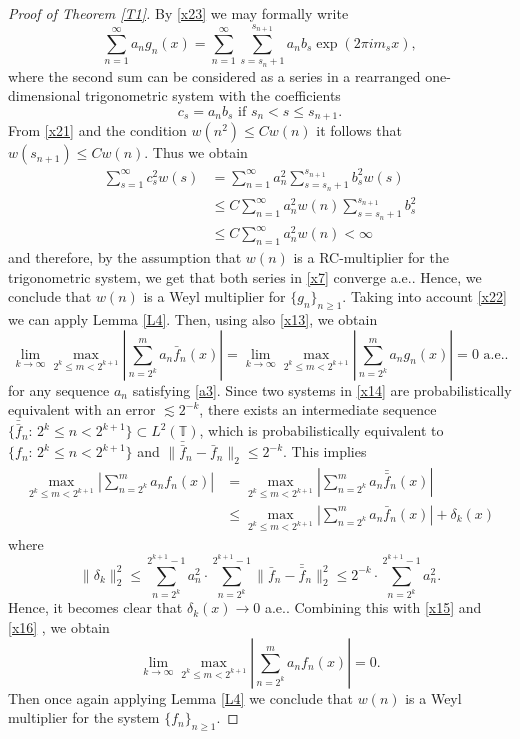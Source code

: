 \documentclass[12pt,reqno,fleqn]{amsart}
\theoremstyle{plain} %
\theoremstyle{remark}
\def\ZT{\ensuremath{\mathbb T}}
\theoremstyle{plain}
\numberwithin{equation}{section}
\newcommand {\e }[1]{\eqref{#1}}
\newcommand {\lem }[1]{Lemma \ref{#1}}
\newcommand {\trm }[1]{Theorem \ref{#1}}
\begin{document}
\begin{proof}[Proof of \trm{T1}]
By \e{x23} we may formally write
\begin{equation}\label{x7}
	\sum_{n=1}^\infty a_ng_n(x)=\sum_{n=1}^{\infty}\sum_{s=s_n+1}^{s_{n+1}}a_nb_s \exp(2\pi i m_sx),
\end{equation}
where the second sum can be considered as a series in a rearranged one-dimensional trigonometric system with the coefficients 
\begin{equation}
	c_s= a_nb_s\text{ if }  s_n<s\le s_{n+1}.
\end{equation}
From \e{x21} and the condition $w(n^2)\le Cw(n)$ it follows that $w(s_{n+1})\le Cw(n)$. Thus we obtain
\begin{align*}
	\sum_{s=1}^\infty c_s^2w(s)&=\sum_{n=1}^\infty a_n^2\sum_{s=s_n+1}^{s_{n+1}}b_s^2w(s)\\
	&\le C\sum_{n=1}^\infty a_n^2w(n)\sum_{s=s_n+1}^{s_{n+1}}b_s^2\\
	&\le C\sum_{n=1}^\infty a_n^2w(n)<\infty
\end{align*}
and therefore, by the assumption that $w(n)$ is a RC-multiplier for the trigonometric system, we get that both series in \e{x7} converge a.e..
Hence, we conclude that $w(n)$ is a Weyl multiplier for $\{g_n\}_{n\ge1}$. Taking into account \e{x22} we can apply \lem{L4}. Then, using also \e{x13}, we obtain
	\begin{equation}\label{x15}
		\lim_{k\to\infty}\max_{2^k\le m<2^{k+1}}\left|\sum_{n=2^k}^{m}a_n\bar f_n(x)\right|=\lim_{k\to\infty}\max_{2^k\le m<2^{k+1}}\left|\sum_{n=2^k}^{m}a_ng_n(x)\right|=0\text{ a.e..}
	\end{equation}
for any sequence $a_n$ satisfying \e{a3}. Since two systems in \e{x14} are probabilistically equivalent with an error $\lesssim 2^{-k}$, there exists an intermediate sequence $\{\bar{\bar f}_n:\, 2^k\le n<2^{k+1}\}\subset L^2(\ZT)$, which is probabilistically equivalent to $ \{f_n:\, 2^k\le n <2^{k+1}\}$ and $\|\bar{\bar f}_n-\bar f_n\|_2\le 2^{-k}$. This implies 
\begin{align}
	\max_{2^k\le m<2^{k+1}}\left|\sum_{n=2^k}^{m}a_n f_n(x)\right|&=\max_{2^k\le m<2^{k+1}}\left|\sum_{n=2^k}^{m}a_n\bar {\bar f}_n(x)\right|\\
	&\le \max_{2^k\le m<2^{k+1}}\left|\sum_{n=2^k}^{m}a_n\bar f_n(x)\right|+\delta_k(x)\label{x16}
\end{align}
where 
\begin{equation}\label{x17}
	\|\delta_k\|_2^2\le \sum_{n=2^k}^{2^{k+1}-1}a_n^2\cdot \sum_{n=2^k}^{2^{k+1}-1}\|\bar f_n-\bar{\bar f}_n\|_2^2\le 2^{-k}\cdot \sum_{n=2^k}^{2^{k+1}-1}a_n^2.
\end{equation}
Hence, it becomes clear that $\delta_k(x)\to 0$ a.e.. Combining this with \e{x15} and \e{x16} , we obtain 
\begin{equation*}
	\lim_{k\to\infty}\max_{2^k\le m<2^{k+1}}\left|\sum_{n=2^k}^{m}a_n f_n(x)\right|=0.
\end{equation*}
Then once again applying \lem{L4} we conclude that $w(n)$ is a Weyl multiplier for the system $\{f_n\}_{n\ge 1}$.


\end{proof}
\end{document}
